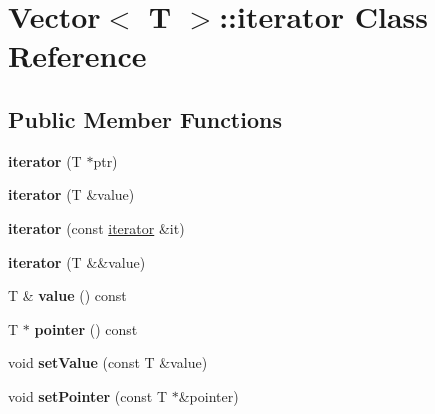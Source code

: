 \hypertarget{class_vector_1_1iterator}{}\section{Vector$<$ T $>$\+::iterator Class Reference}
\label{class_vector_1_1iterator}
\subsection*{Public Member Functions}
\begin{DoxyCompactItemize}
\item 
\mbox{\label{class_vector_1_1iterator_a26b6fed0bea3948849dd8d23dc13f408}} 
{\bfseries iterator} (T $\ast$ptr)
\item 
\mbox{\label{class_vector_1_1iterator_ab680e2b2b8efa580ae2de2442233de67}} 
{\bfseries iterator} (T \&value)
\item 
\mbox{\label{class_vector_1_1iterator_a8f035a07a6f599fb632d997accf04ac6}} 
{\bfseries iterator} (const \mbox{\hyperlink{class_vector_1_1iterator}{iterator}} \&it)
\item 
\mbox{\label{class_vector_1_1iterator_a93235e0b51476372bf3b20959c755f51}} 
{\bfseries iterator} (T \&\&value)
\item 
\mbox{\label{class_vector_1_1iterator_a82525565e36acf51a2d3dfde75697599}} 
T \& {\bfseries value} () const
\item 
\mbox{\label{class_vector_1_1iterator_aa00499c957247a9df0b01efa2830ade2}} 
T $\ast$ {\bfseries pointer} () const
\item 
\mbox{\label{class_vector_1_1iterator_a018528e82b7863563c48ce859ee747b2}} 
void {\bfseries set\+Value} (const T \&value)
\item 
\mbox{\label{class_vector_1_1iterator_a5ff0016437e2dc5386089e264872b265}} 
void {\bfseries set\+Pointer} (const T $\ast$\&pointer)
\item 
\mbox{\label{class_vector_1_1iterator_a1986868636003dcb2725fce8d2520eef}} 

\end{DoxyCompactItemize}
